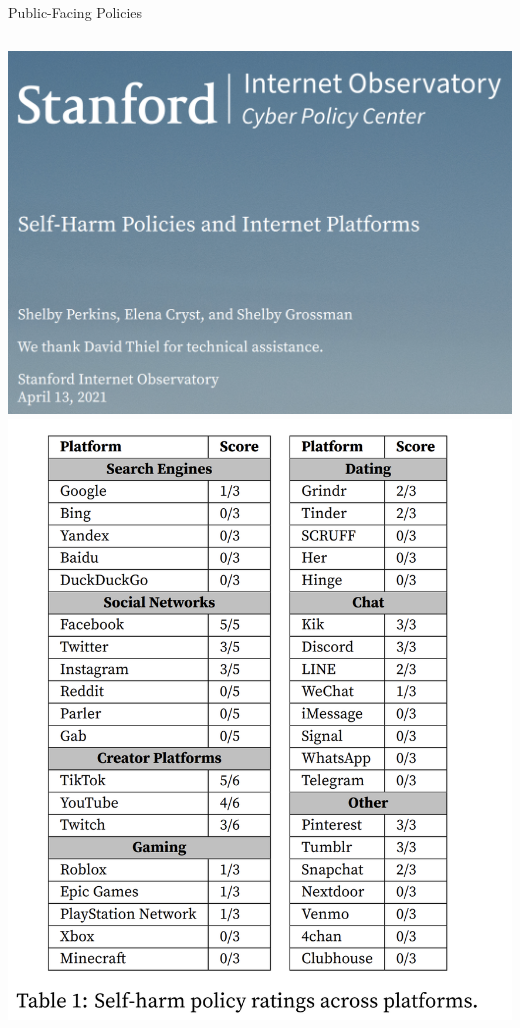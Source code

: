 \documentclass[nobackground,dvipsnames,table,aspectratio=169]{beamer}
\begin{document}
\begin{frame}{Public-Facing Policies}
    \begin{columns}
            \includegraphics[width=\textwidth]{sio-self-harm-policies-report}
            \includegraphics[width=\textwidth]{sio-self-harm-policies-table}
    \end{columns}
\end{frame}
\end{document}
